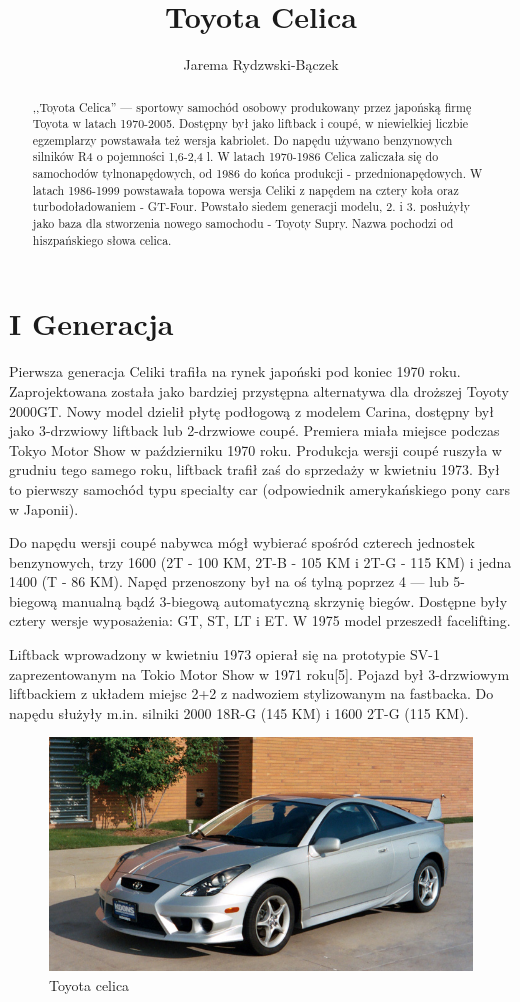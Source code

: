 \documentclass[a4paper,12pt]{article}
\title{Toyota Celica}
\author{Jarema Rydzwski-Bączek}
\begin{document}
\maketitle


\begin{abstract}
,,Toyota Celica'' --- sportowy samochód osobowy produkowany przez japońską firmę Toyota w latach 1970-2005. Dostępny był jako liftback i coupé, w niewielkiej liczbie egzemplarzy powstawała też wersja kabriolet. Do napędu używano benzynowych silników R4 o pojemności 1,6-2,4 l. W latach 1970-1986 Celica zaliczała się do samochodów tylnonapędowych, od 1986 do końca produkcji - przednionapędowych. W latach 1986-1999 powstawała topowa wersja Celiki z napędem na cztery koła oraz turbodoładowaniem - GT-Four. Powstało siedem generacji modelu, 2. i 3. posłużyły jako baza dla stworzenia nowego samochodu - Toyoty Supry. Nazwa pochodzi od hiszpańskiego słowa celica.
\end{abstract}
\section{I Generacja}

Pierwsza generacja Celiki trafiła na rynek japoński pod koniec 1970 roku. Zaprojektowana została jako bardziej przystępna alternatywa dla droższej Toyoty 2000GT. Nowy model dzielił płytę podłogową z modelem Carina, dostępny był jako 3-drzwiowy liftback lub 2-drzwiowe coupé. Premiera miała miejsce podczas Tokyo Motor Show w październiku 1970 roku. Produkcja wersji coupé ruszyła w grudniu tego samego roku, liftback trafił zaś do sprzedaży w kwietniu 1973. Był to pierwszy samochód typu specialty car (odpowiednik amerykańskiego pony cars w Japonii).

Do napędu wersji coupé nabywca mógł wybierać spośród czterech jednostek benzynowych, trzy 1600 (2T - 100 KM, 2T-B - 105 KM i 2T-G - 115 KM) i jedna 1400 (T - 86 KM). Napęd przenoszony był na oś tylną poprzez 4 --- lub 5-biegową manualną bądź 3-biegową automatyczną skrzynię biegów. Dostępne były cztery wersje wyposażenia: GT, ST, LT i ET. W 1975 model przeszedł facelifting.

Liftback wprowadzony w kwietniu 1973 opierał się na prototypie SV-1 zaprezentowanym na Tokio Motor Show w 1971 roku[5]. Pojazd był 3-drzwiowym liftbackiem z układem miejsc 2+2 z nadwoziem stylizowanym na fastbacka. Do napędu służyły m.in. silniki 2000 18R-G (145 KM) i 1600 2T-G (115 KM).


\begin{figure}
\includegraphics[width=0.5\hsize] {toyota.png}
\caption{Toyota celica}\label{fig:toyota}
\end{figure}
\end{document}
